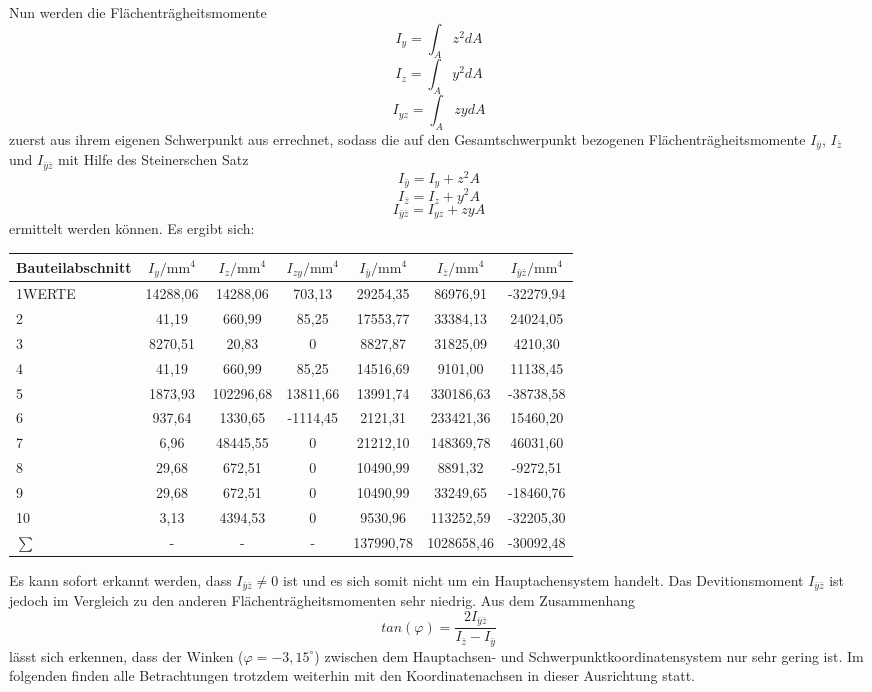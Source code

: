 Nun werden die Flächenträgheitsmomente 
\begin{equation}
	I_{y} = \int_{A}^{}z^2dA
\end{equation}
\begin{equation}
I_{z} = \int_{A}^{}y^2dA
\end{equation}
\begin{equation}
I_{yz} = \int_{A}^{}zydA
\end{equation}
 zuerst aus ihrem eigenen Schwerpunkt aus errechnet, sodass die auf den Gesamtschwerpunkt bezogenen Flächenträgheitsmomente $I_{\bar{y}}$, $I_{\bar{z}}$ und $I_{\bar{y}\bar{z}}$ mit Hilfe des Steinerschen Satz
 \begin{equation}
 	I_{\bar{y}} = I_{y} + z^2A
 \end{equation}
\begin{equation}
I_{\bar{z}} = I_{z} + y^2A
\end{equation}
\begin{equation}
I_{\bar{y}\bar{z}} = I_{yz} + zyA
\end{equation}
 ermittelt werden können.
Es ergibt sich:
\begin{center}

\begin{tabular}[h]{l|c|c|c||c|c|c}
Bauteilabschnitt&$I_{y}/\mathrm{mm}^4$&$I_{z}/\mathrm{mm}^4$&$I_{zy}/\mathrm{mm}^4$&$I_{\bar{y}}/\mathrm{mm}^4$&$I_{\bar{z}}/\mathrm{mm}^4$&$I_{\bar{y}\bar{z}}/\mathrm{mm}^4$\\
\hline
1WERTE&14288,06&14288,06&703,13&29254,35&86976,91&-32279,94\\
2&41,19&660,99&85,25&17553,77&33384,13&24024,05\\
3&8270,51&20,83&0&8827,87&31825,09&4210,30\\
4&41,19&660,99&85,25&14516,69&9101,00&11138,45\\
5&1873,93&102296,68&13811,66&13991,74&330186,63&-38738,58\\
6&937,64&1330,65&-1114,45&2121,31&233421,36&15460,20\\
7&6,96&48445,55&0&21212,10&148369,78&46031,60\\
8&29,68&672,51&0&10490,99&8891,32&-9272,51\\
9&29,68&672,51&0&10490,99&33249,65&-18460,76\\
10&3,13&4394,53&0&9530,96&113252,59&-32205,30\\
\hline
$\sum{}$&-&-&-&137990,78&1028658,46&-30092,48
\end{tabular}
\end{center}
Es kann sofort erkannt werden, dass $I_{\bar{y}\bar{z}} \neq 0$ ist und es sich somit nicht um ein Hauptachensystem handelt. Das Devitionsmoment  $I_{\bar{y}\bar{z}}$ ist jedoch im Vergleich zu den anderen Flächenträgheitsmomenten sehr niedrig. 
Aus dem Zusammenhang
\begin{equation}
	tan(\varphi)=\frac{2I_{\bar{y}\bar{z}}}{I_{\bar{z}}-I_{\bar{y}}}
\end{equation}
lässt sich erkennen, dass der Winken ($\varphi =-3,15^\circ$) zwischen dem Hauptachsen- und Schwerpunktkoordinatensystem nur sehr gering ist. Im folgenden finden alle Betrachtungen trotzdem weiterhin mit den Koordinatenachsen in dieser Ausrichtung statt.

